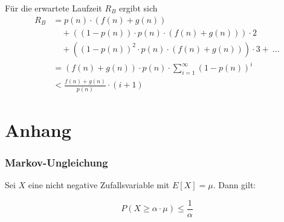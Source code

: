 \documentclass{scrartcl}%
\begin{document}
\begin{itemize}
\begin{itemize}
            Für die erwartete Laufzeit $R_B$ ergibt sich
            \begin{align*}
                R_B &= p(n) \cdot \left( f(n) + g(n) \right) \\
                &\quad + ((1 - p(n)) \cdot p(n) \cdot (f(n) + g(n))) \cdot 2\\
                &\quad + ((1 - p(n))^2 \cdot p(n) \cdot (f(n) + g(n))) \cdot 3 +\ \dots \\\nonumber
                &=(f(n) + g(n)) \cdot p(n) \cdot \sum^{\infty}_{i=1}\left( 1-p(n)\right)^{i}\\
                & < \frac{f(n) + g(n)}{p(n)} \cdot (i+1)
            \end{align*}
        \end{itemize}
    \end{itemize}

    \section*{Anhang}
    \label{sec:anhang}

    \subsubsection*{Markov-Ungleichung}
    Sei $X$ eine nicht negative Zufallsvariable mit $E[X] = \mu$.
    Dann gilt:

    \begin{equation*}
        P(X \geq \alpha \cdot \mu ) \leq \frac{1}{\alpha}
    \end{equation*}
\end{document}
